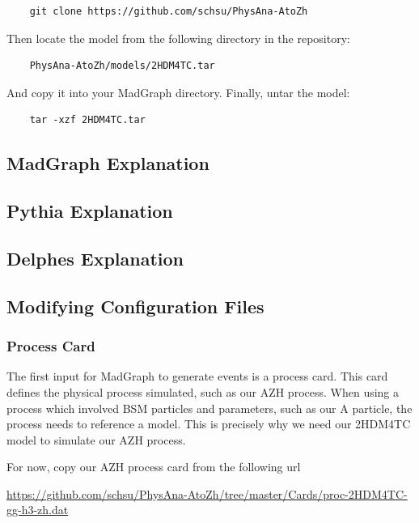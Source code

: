 \documentclass{article}
\begin{document}
\begin{verbatim}
	git clone https://github.com/schsu/PhysAna-AtoZh
\end{verbatim}

Then locate the model from the following directory in the repository:

\begin{verbatim}
	PhysAna-AtoZh/models/2HDM4TC.tar
\end{verbatim}

And copy it into your MadGraph directory. Finally, untar the model:

\begin{verbatim}
	tar -xzf 2HDM4TC.tar
\end{verbatim}

\subsection{MadGraph Explanation}

\subsection{Pythia Explanation}

\subsection{Delphes Explanation}

\subsection{Modifying Configuration Files}

\subsubsection*{Process Card}

The first input for MadGraph to generate events is a process card. This card defines the physical process simulated, such as our AZH process. When using a process which involved BSM particles and parameters, such as our A particle, the process needs to reference a model. This is precisely why we need our 2HDM4TC model to simulate our AZH process.

\bigskip

For now, copy our AZH process card from the following url

\bigskip

\url{https://github.com/schsu/PhysAna-AtoZh/tree/master/Cards/proc-2HDM4TC-gg-h3-zh.dat}
\end{document}
